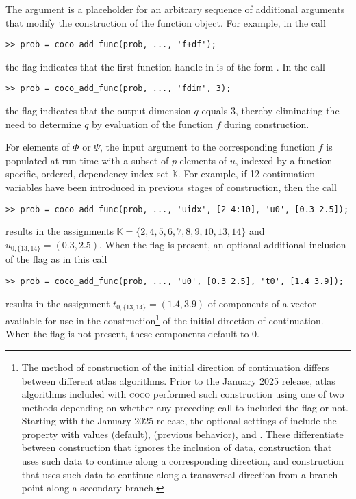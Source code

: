 The argument  is a placeholder for an arbitrary sequence of additional arguments that modify the construction of the function object. For example, in the call
\begin{lstlisting}[language=coco-highlight]
>> prob = coco_add_func(prob, ..., 'f+df');
\end{lstlisting}
the flag  indicates that the first function handle in  is of the form . In the call
\begin{lstlisting}[language=coco-highlight]
>> prob = coco_add_func(prob, ..., 'fdim', 3);
\end{lstlisting}
the flag  indicates that the output dimension $q$ equals $3$, thereby eliminating the need to determine $q$ by evaluation of the function $f$ during construction.

For elements of $\Phi$ or $\Psi$, the input argument to the corresponding function $f$ is populated at run-time with a subset of $p$ elements of $u$, indexed by a function-specific, ordered, dependency-index set $\mathbb{K}$. For example, if 12 continuation variables have been introduced in previous stages of construction, then the call
\begin{lstlisting}[language=coco-highlight]
>> prob = coco_add_func(prob, ..., 'uidx', [2 4:10], 'u0', [0.3 2.5]);
\end{lstlisting}
results in the assignments $\mathbb{K}=\{2,4,5,6,7,8,9,10,13,14\}$ and $u_{0,\{13,14\}}=(0.3,2.5)$. When the  flag is present, an optional additional inclusion of the flag  as in this call
\begin{lstlisting}[language=coco-highlight]
>> prob = coco_add_func(prob, ..., 'u0', [0.3 2.5], 't0', [1.4 3.9]);
\end{lstlisting}
results in the assignment $t_{0,\{13,14\}}=(1.4,3.9)$ of components of a vector available for use in the construction\footnote{The method of construction of the initial direction of continuation differs between different atlas algorithms. Prior to the January 2025 release, atlas algorithms included with \textsc{coco} performed such construction using one of two methods depending on whether any preceding call to  included the  flag or not. Starting with the January 2025 release, the optional settings of  include the  property with values  (default),  (previous behavior), and . These differentiate between construction that ignores the inclusion of  data, construction that uses such data to continue along a corresponding direction, and construction that uses such data to continue along a transversal direction from a branch point along a secondary branch.}  of the initial direction of continuation. When the  flag is not present, these components default to $0$.
 
